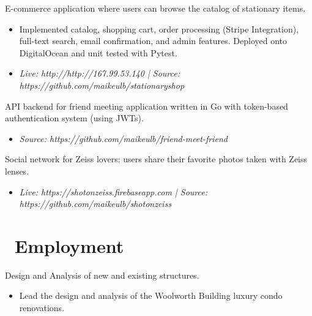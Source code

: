 \documentclass{resume}
\begin{document}
E-commerce application where users can browse the catalog of stationary items.
\begin{itemize}
  \item Implemented catalog, shopping cart, order processing (Stripe Integration), full-text search, email confirmation, and admin features. Deployed onto DigitalOcean and unit tested with Pytest.
  \item \textit{Live: http://http://167.99.53.140 | Source: https://github.com/maikeulb/stationaryshop}
\end{itemize}

API backend for friend meeting application written in Go with token-based authentication system (using JWTs).
\begin{itemize}
   \item \textit{Source: https://github.com/maikeulb/friend-meet-friend}
\end{itemize}

Social network for Zeiss lovers: users share their favorite photos taken with
Zeiss lenses.
\begin{itemize}
   \item \textit{Live: https://shotonzeiss.firebaseapp.com | Source: https://github.com/maikeulb/shotonzeiss}
\end{itemize}


\section{\faUsers\ Employment}

Design and Analysis of new and existing structures.
\begin{itemize}
  \item Lead the design and analysis of the Woolworth Building
          luxury condo renovations. 
\end{itemize}
\end{document}
